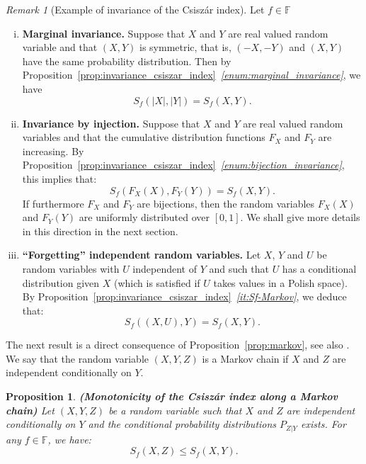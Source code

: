 \documentclass[12pt]{article}
\newcommand{\F}{{\mathbb F}}
\theoremstyle{plain}
\newtheorem{prop}[theo]{Proposition}
\theoremstyle{remark}
\newtheorem{rem}{Remark}
\begin{document}
\begin{rem}[Example of invariance of the  Csisz\'ar index]
  \label{rem:inv-gen-index}
  Let $f\in \F$
  \begin{enumerate}[(i)]
  \item \textbf{Marginal invariance.}
Suppose that $X$ and $Y$ are real valued random variable and that
$(X,Y)$  is
symmetric, that is,  $(-X, -Y)$ and $(X,Y)$ have the same
probability distribution. Then by Proposition~\ref{prop:invariance_csiszar_index}{\it ~\ref{enum:marginal_invariance}}, 
we have 
$$
S_f(|X|,|Y|)=S_f(X,Y).
$$

\item \textbf{Invariance by injection.}
Suppose that $X$ and $Y$ are real valued random variables and that the
cumulative distribution  functions $F_X$ and $F_Y$ are
increasing. By Proposition~\ref{prop:invariance_csiszar_index}{\it ~\ref{enum:bijection_invariance}}, this implies that:
\begin{equation}
   \label{eq:Sf-cop-density}
  S_f(F_X(X), F_Y(Y))=S_f(X,Y).
\end{equation}
If furthermore $F_X$ and $F_Y$ are bijections, then the random variables  $F_X(X)$ and $F_Y(Y)$ are uniformly distributed over $[0,
1]$. We shall give more details in this direction in the next section. 

\item \textbf{``Forgetting'' independent random variables.}
\label{it:removing_independent_variables}
Let $X$, $Y$ and $U$ be random variables with $U$ independent of $Y$ and such that $U$ has a conditional distribution given $X$ (which is satisfied if $U$ takes values in a Polish space).  By Proposition~\ref{prop:invariance_csiszar_index}{\it ~\ref{it:Sf-Markov}}, we deduce that:
    \[
    S_f((X,U), Y)=S_f(X, Y). 
    \]
  \end{enumerate}
\end{rem}


The     next      result     is     a     direct      consequence     of
Proposition~\ref{prop:markov},                  see                 also
\citet[Theorem~7.16]{polyanskiy2025information}.  We say  that the random
variable $(X,Y,Z)$  is a Markov  chain if $X  $ and $Z$  are independent
conditionally on $Y$.


\begin{prop}{\bf (Monotonicity of the Csisz\'ar index along a Markov chain)}
    \label{prop:monoticity_csiszar_index_markov}
    Let  $(X,Y,Z)$ be  a random  variable  such that  $X $  and $Z$  are
    independent  conditionally on  $Y$ and  the conditional  probability
    distributions $P_{Z|Y}$ exists.  For any $f \in \F$, we have:
    \[
    S_f(X,Z) \leq S_f(X,Y) .
    \]
\end{prop}
\end{document}
